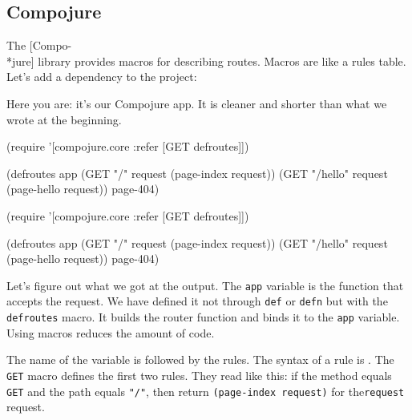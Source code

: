\subsection{Compojure}

\label{compojure}


The [Compo-\\*jure] library provides macros for describing routes. Macros are like a rules table.
Let's add a dependency to the project:

\begin{english}
\begin{clojure}
[compojure "1.6.1"]
\end{clojure}
\end{english}

Here you are: it's our Compojure app. It is cleaner and shorter than what we wrote at the beginning.

\ifx\devicetype\mobile

\begin{english}
\begin{clojure}
(require '[compojure.core
:refer [GET defroutes]])

(defroutes app
(GET "/" request
(page-index request))
(GET "/hello" request
(page-hello request))
page-404)
\end{clojure}
\end{english}

\else

\begin{english}
\begin{clojure}
(require '[compojure.core :refer [GET defroutes]])

(defroutes app
(GET "/"      request (page-index request))
(GET "/hello" request (page-hello request))
page-404)
\end{clojure}
\end{english}

\fi

Let's figure out what we got at the output. The \verb|app| variable is the function that accepts the request. We have defined it not through \verb|def| or \verb|defn| but with
the \verb|defroutes| macro. It builds the router function and binds it to the \verb|app| variable. Using macros reduces the amount of code.

The name of the variable is followed by the rules. The syntax of a rule is .
The \verb|GET| macro defines the first two rules. They read like this:
if the method equals \verb|GET| and the path equals \verb|"/"|, then return \verb|(page-index request)| for the\verb|request| request.

